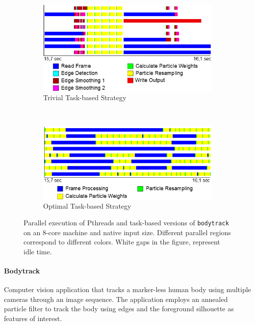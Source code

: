 \begin{figure}[ht!]
	\vspace{1cm}
	\centering
  \begin{subfigure}{0.9\textwidth}
		\includegraphics[width=\textwidth]{ifcg/figures/bodytrack-ompss-native-8-2dp_tasks_pthreads}
		\caption{Trivial Task-based Strategy}
	\label{fig:bodytrack-2dp_tasks-trace_pthreads}
  \end{subfigure}%
\\
\vspace{1cm}
\begin{subfigure}{0.9\textwidth}
		\includegraphics[width=\textwidth]{ifcg/figures/bodytrack-ompss-native-8-2dp_tasks_ompss}
		\caption{Optimal Task-based Strategy}
	\label{fig:bodytrack-2dp_tasks-trace_ompss}
  \end{subfigure}
	\caption{Parallel execution of Pthreads and task-based versions of \texttt{bodytrack} on an 8-core machine and native input size. Different parallel regions correspond to different colors.  White gaps in the figure, represent idle time.}%
	\label{fig:bodytrack-2dp_tasks-trace}%
\end{figure}

\paragraph{\textbf{Bodytrack}}
Computer vision application that tracks a marker-less human body using multiple cameras
through an image sequence.  The application employs an annealed particle filter to track
the body using edges and the foreground silhouette as features of interest.

